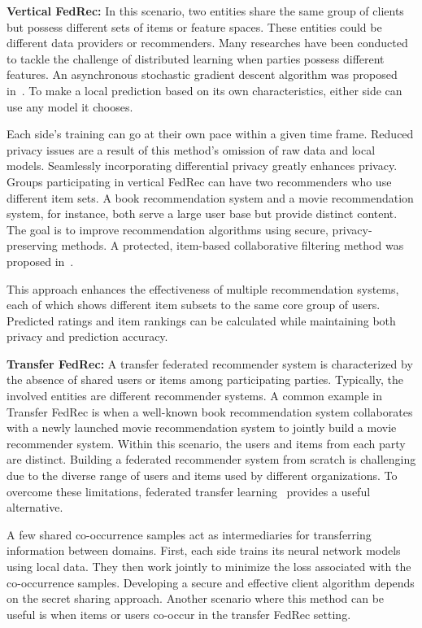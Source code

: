 \noindent\textbf{Vertical FedRec:} In this scenario, two entities share the same group of clients but possess different sets of items or feature spaces. These entities could be different data providers or recommenders. Many researches have been conducted to tackle the challenge of distributed learning when parties possess different features. An asynchronous stochastic gradient descent algorithm was proposed in~\cite{ref16}. To make a local prediction based on its own characteristics, either side can use any model it chooses.

Each side's training can go at their own pace within a given time frame. Reduced privacy issues are a result of this method's omission of raw data and local models. Seamlessly incorporating differential privacy greatly enhances privacy. Groups participating in vertical FedRec can have two recommenders who use different item sets. A book recommendation system and a movie recommendation system, for instance, both serve a large user base but provide distinct content. The goal is to improve recommendation algorithms using secure, privacy-preserving methods. A protected, item-based collaborative filtering method was proposed in~\cite{ref17}.

This approach enhances the effectiveness of multiple recommendation systems, each of which shows different item subsets to the same core group of users. Predicted ratings and item rankings can be calculated while maintaining both privacy and prediction accuracy.

\noindent\textbf{Transfer FedRec:} A transfer federated recommender system is characterized by the absence of shared users or items among participating parties. Typically, the involved entities are different recommender systems. A common example in Transfer FedRec is when a well-known book recommendation system collaborates with a newly launched movie recommendation system to jointly build a movie recommender system. Within this scenario, the users and items from each party are distinct. Building a federated recommender system from scratch is challenging due to the diverse range of users and items used by different organizations. To overcome these limitations, federated transfer learning~\cite{ref18} provides a useful alternative.

A few shared co-occurrence samples act as intermediaries for transferring information between domains. First, each side trains its neural network models using local data. They then work jointly to minimize the loss associated with the co-occurrence samples. Developing a secure and effective client algorithm depends on the secret sharing approach. Another scenario where this method can be useful is when items or users co-occur in the transfer FedRec setting.


